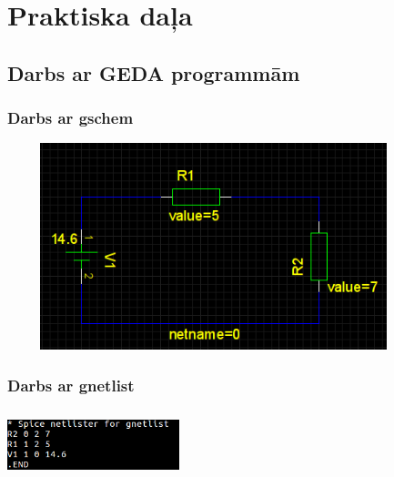 \documentclass{report}
\begin{document}
\chapter{Praktiska daļa}
\section{Darbs ar GEDA programmām}
    \subsection{Darbs ar gschem}

        \includegraphics[width=12cm, height=6cm]{2.png}

    \subsection{Darbs ar gnetlist}

\includegraphics[width=5cm, height=2cm]{3.png}
\end{document}
